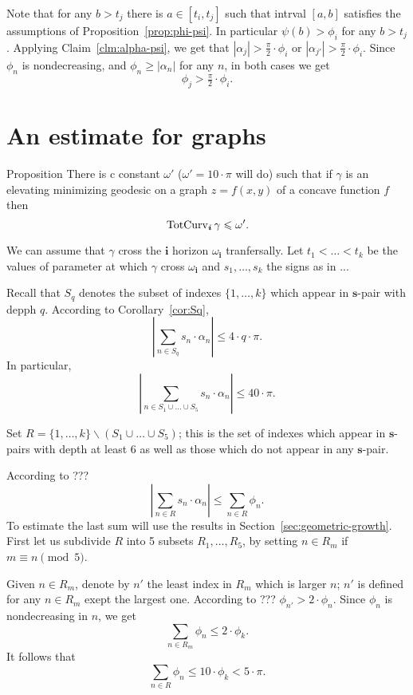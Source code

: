 \documentclass[a4paper,10pt]{amsart}
\begin{document}
Note that for any $b>t_j$ there is $a\in[t_i,t_j]$
such that intrval $[a,b]$ satisfies the assumptions of Proposition~\ref{prop:phi-psi}.
In particular $\psi(b)>\phi_i$ for any $b>t_j$.
Applying Claim~\ref{clm:alpha-psi},
we get that $|\alpha_j|>\tfrac\pi2\cdot \phi_i$ or 
$|\alpha_{j'}|>\tfrac\pi2\cdot \phi_i$.
Since $\phi_n$ is nondecreasing,
and $\phi_n\ge |\alpha_n|$ for any $n$,
in both cases we get
\[\phi_j>\tfrac\pi2\cdot \phi_i.\]
\qeds


\section{An estimate for graphs}\label{sec:graph}

\begin{thm}{Proposition}
There is c constant $\omega'$ ($\omega'=10\cdot\pi$ will do)
such that
if $\gamma$ is an elevating minimizing geodesic on a graph $z=f(x,y)$
of a concave function $f$ then
\[\mathop{\rm TotCurv}\nolimits_{\bm{i}}\gamma\leqslant \omega'.\]
\end{thm}

We can assume that
$\gamma$ cross the $\bm{i}$ horizon $\omega_{\bm{i}}$ tranfersally.
Let $t_1<\dots<t_k$ be the values of parameter at which $\gamma$ cross $\omega_{\bm{i}}$ 
and 
$s_1,\dots,s_k$ the signs as in ...

Recall that $S_q$ denotes the subset of indexes $\{1,\dots,k\}$
which appear in $\bm{s}$-pair with depph $q$.
According to Corollary~\ref{cor:Sq},
\[\left|\sum_{n\in S_q}s_n\cdot\alpha_n\right|\le 4\cdot q\cdot \pi.\]
In particular,
\[\left|\sum_{n\in S_1\cup\dots\cup S_5}
s_n\cdot\alpha_n\right|
\le 
40\cdot\pi.\]

Set $R=\{1,\dots,k\}\backslash (S_1\cup\dots\cup S_5)$;
this is the set of indexes which appear in $\bm{s}$-pairs with depth at least $6$ 
as well as those which do not appear in any $\bm{s}$-pair.

According to ???
\[\left|\sum_{n\in R}
s_n\cdot\alpha_n\right|\le \sum_{n\in R}\phi_n.\] 
To estimate the last sum will use the results in Section~\ref{sec:geometric-growth}.
First let us subdivide $R$ into 5 subsets $R_1,\dots,R_5$,
by setting 
$n\in R_m$ if $m\equiv n\pmod 5$.

Given $n\in R_m$, denote by $n'$ the least index in $R_m$ which is larger $n$;
$n'$ is defined for any $n\in R_m$ exept the largest one.
According to ??? $\phi_{n'}>2\cdot \phi_n$.
Since $\phi_n$ is nondecreasing in $n$,
we get 
\[\sum_{n\in R_m}\phi_n\le 2\cdot\phi_k.\]
It follows that 
\[\sum_{n\in R}\phi_n\le 10\cdot\phi_k< 5\cdot\pi.\]
\end{document}
